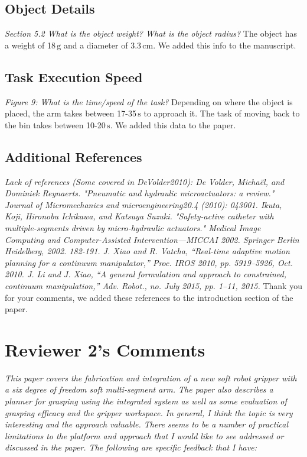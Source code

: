 \documentclass[letterpaper, 10 pt, twocolumn, conference]{article}
\newcommand{\unit}[1]{\ensuremath{\, \mathrm{#1}}} %
\begin{document}
\subsection{Object Details}
\textit{Section 5.2 What is the object weight? What is the object radius?}
%
The object has a weight of 18\unit{g} and a diameter of 3.3\unit{cm}. We added this info to the manuscript.
%
\subsection{Task Execution Speed}
\textit{Figure 9: What is the time/speed of the task?}
%
Depending on where the object is placed, the arm takes between 17-35\unit{s} to approach it. The task of moving back to the bin takes between 10-20\unit{s}. We added this data to the paper. 
%
\subsection{Additional References}
%
\textit{Lack of references (Some covered in DeVolder2010):
De Volder, Michaël, and Dominiek Reynaerts. "Pneumatic and hydraulic microactuators: a review." Journal of Micromechanics and microengineering20.4 (2010): 043001.
Ikuta, Koji, Hironobu Ichikawa, and Katsuya Suzuki. "Safety-active catheter with multiple-segments driven by micro-hydraulic actuators." Medical Image Computing and Computer-Assisted Intervention—MICCAI 2002. Springer Berlin Heidelberg, 2002. 182-191.
J. Xiao and R. Vatcha, “Real-time adaptive motion planning for a continuum manipulator,” Proc. IROS 2010, pp. 5919–5926, Oct. 2010.
J. Li and J. Xiao, “A general formulation and approach to constrained, continuum manipulation,” Adv. Robot., no. July 2015, pp. 1–11, 2015.}
%
Thank you for your comments, we added these references to the introduction section of the paper.
%
%
\section{Reviewer 2's Comments}
%
\textit{This paper covers the fabrication and integration of a new soft robot gripper with a six degree of freedom soft multi-segment arm. The paper also describes a planner for grasping using the integrated system as well as some evaluation of grasping efficacy and the gripper workspace.}
%
\textit{In general, I think the topic is very interesting and the approach valuable. There seems to be a number of practical limitations to the platform and approach that I would like to see addressed or discussed in the paper. The following are specific feedback that I have:}
%
\end{document}

